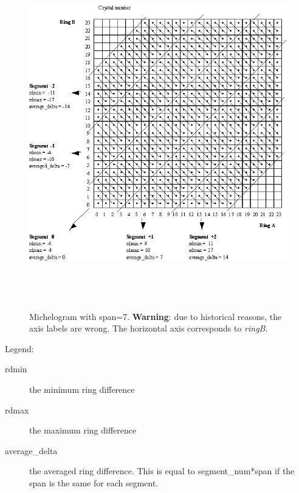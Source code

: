 \documentclass{article}
\begin{document}
\begin{figure}[htbp]
\begin{center}
\includegraphics[width=6.in, height=6in]{graphics/STIR-glossaryFig1}
\caption{Michelogram with span=7. \textbf{Warning}: due to historical 
reasons, the axis labels are wrong. The horizontal axis corresponds to
\textit{ringB}.}
\end{center}
\end{figure}


Legend: 
\begin{description}
\item[rdmin] the minimum ring difference
\item[rdmax] the maximum ring difference
\item[average\_delta] the averaged ring difference. This is equal 
to segment\_num*span if the span is the same for each segment.
\end{description}
\end{document}
